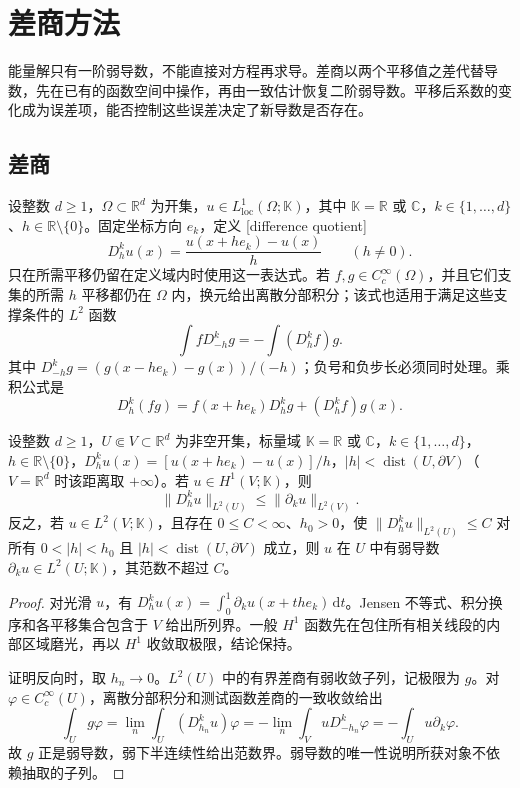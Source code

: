 \section{差商方法}
\label{b2:sec:1601}

能量解只有一阶弱导数，不能直接对方程再求导。差商以两个平移值之差代替导数，先在已有的函数空间中操作，再由一致估计恢复二阶弱导数。平移后系数的变化成为误差项，能否控制这些误差决定了新导数是否存在。

\subsection{差商}
\label{b2:subsec:160101}

设整数 \(d\geq1\)，\(\Omega\subset\mathbb R^d\) 为开集，\(u\in L^1_{\mathrm{loc}}(\Omega;\mathbb K)\)，其中 \(\mathbb K=\mathbb R\) 或 \(\mathbb C\)，\(k\in\{1,\ldots,d\}\)、\(h\in\mathbb R\setminus\{0\}\)。固定坐标方向 \(e_k\)，定义 [difference quotient]
\[D_h^ku(x)=\frac{u(x+he_k)-u(x)}h\qquad(h\ne0).\]
只在所需平移仍留在定义域内时使用这一表达式。若 \(f,g\in C_c^\infty(\Omega)\)，并且它们支集的所需 \(h\) 平移都仍在 \(\Omega\) 内，换元给出离散分部积分；该式也适用于满足这些支撑条件的 \(L^2\) 函数
\[\int fD_{-h}^kg=-\int(D_h^kf)g.\]
其中 \(D_{-h}^kg=(g(x-he_k)-g(x))/(-h)\)；负号和负步长必须同时处理。乘积公式是
\[D_h^k(fg)=f(x+he_k)D_h^kg+(D_h^kf)g(x).\]

\begin{lemma}[差商与弱导数]
\label{b2:lem:16-difference-quotient}
设整数 \(d\geq1\)，\(U\Subset V\subset\mathbb R^d\) 为非空开集，标量域 \(\mathbb K=\mathbb R\) 或 \(\mathbb C\)，\(k\in\{1,\ldots,d\}\)，\(h\in\mathbb R\setminus\{0\}\)，\(D_h^ku(x)=[u(x+he_k)-u(x)]/h\)，\(|h|<\operatorname{dist}(U,\partial V)\)（\(V=\mathbb R^d\) 时该距离取 \(+\infty\)）。若 \(u\in H^1(V;\mathbb K)\)，则
\[\lVert D_h^ku\rVert_{L^2(U)}\le\lVert\partial_ku\rVert_{L^2(V)}.\]
反之，若 \(u\in L^2(V;\mathbb K)\)，且存在 \(0\leq C<\infty\)、\(h_0>0\)，使 \(\lVert D_h^ku\rVert_{L^2(U)}\le C\) 对所有 \(0<|h|<h_0\) 且 \(|h|<\operatorname{dist}(U,\partial V)\) 成立，则 \(u\) 在 \(U\) 中有弱导数 \(\partial_ku\in L^2(U;\mathbb K)\)，其范数不超过 \(C\)。
\end{lemma}
\begin{proof}
对光滑 \(u\)，有 \(D_h^ku(x)=\int_0^1\partial_ku(x+the_k)\,\mathrm dt\)。Jensen 不等式、积分换序和各平移集合包含于 \(V\) 给出所列界。一般 \(H^1\) 函数先在包住所有相关线段的内部区域磨光，再以 \(H^1\) 收敛取极限，结论保持。

证明反向时，取 \(h_n\to0\)。\(L^2(U)\) 中的有界差商有弱收敛子列，记极限为 \(g\)。对 \(\varphi\in C_c^\infty(U)\)，离散分部积分和测试函数差商的一致收敛给出
\[\int_Ug\varphi=\lim_n\int_U(D_{h_n}^ku)\varphi
 =-\lim_n\int_VuD_{-h_n}^k\varphi=-\int_Uu\partial_k\varphi.\]
故 \(g\) 正是弱导数，弱下半连续性给出范数界。弱导数的唯一性说明所获对象不依赖抽取的子列。
\end{proof}


